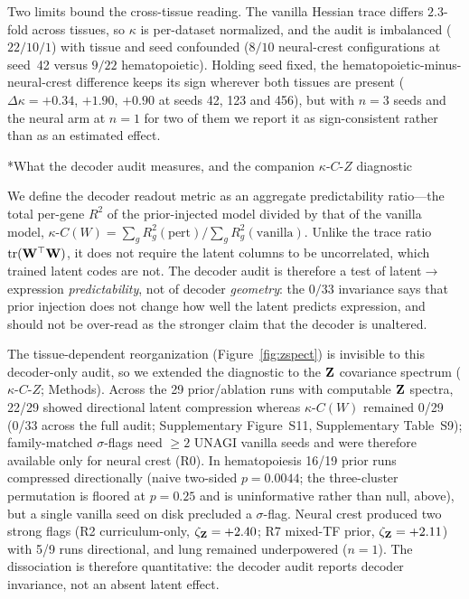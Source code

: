 \documentclass[11pt,a4paper]{article}
\makeatletter
\renewcommand{\subsection}{\@startsection{subsection}{2}{0pt}{10pt plus 4pt}{4pt}{\normalsize\bfseries}}
\newcommand{\tr}{\trloss} %
\makeatother
\begin{document}
Two limits bound the cross-tissue reading. The vanilla Hessian trace differs $2.3$-fold across tissues, so $\kappa$ is per-dataset normalized, and the audit is imbalanced ($22/10/1$) with tissue and seed confounded ($8/10$ neural-crest configurations at seed~42 versus $9/22$ hematopoietic). Holding seed fixed, the hematopoietic-minus-neural-crest difference keeps its sign wherever both tissues are present ($\Delta\kappa=+0.34$, $+1.90$, $+0.90$ at seeds 42, 123 and 456), but with $n=3$ seeds and the neural arm at $n=1$ for two of them we report it as sign-consistent rather than as an estimated effect. 

\subsection*{What the decoder audit measures, and the companion $\kappa$-$C$-$Z$ diagnostic}
\label{sec:predictability}

We define the decoder readout metric as an aggregate predictability ratio---the total per-gene $R^2$ of the prior-injected model divided by that of the vanilla model, $\kappa\text{-}C(W)=\sum_g R^2_g(\text{pert})\big/\sum_g R^2_g(\text{vanilla})$. Unlike the trace ratio $\tr(\Wmat^\top\Wmat)$, it does not require the latent columns to be uncorrelated, which trained latent codes are not. The decoder audit is therefore a test of latent$\to$expression \emph{predictability}, not of decoder \emph{geometry}: the $0/33$ invariance says that prior injection does not change how well the latent predicts expression, and should not be over-read as the stronger claim that the decoder is unaltered.

The tissue-dependent reorganization (Figure~\ref{fig:zspect}) is invisible to this decoder-only audit, so we extended the diagnostic to the $\mathbf{Z}$ covariance spectrum ($\kappa$-$C$-$Z$; Methods). Across the 29 prior/ablation runs with computable $\mathbf{Z}$ spectra, 22/29 showed directional latent compression whereas $\kappa$-$C(W)$ remained 0/29 (0/33 across the full audit; Supplementary Figure~S11, Supplementary Table~S9); family-matched $\sigma$-flags need $\geq2$ UNAGI vanilla seeds and were therefore available only for neural crest (R0). In hematopoiesis 16/19 prior runs compressed directionally (naive two-sided $p=0.0044$; the three-cluster permutation is floored at $p=0.25$ and is uninformative rather than null, above), but a single vanilla seed on disk precluded a $\sigma$-flag. Neural crest produced two strong flags (R2 curriculum-only, $\zeta_{\mathbf{Z}}=+2.40$; R7 mixed-TF prior, $\zeta_{\mathbf{Z}}=+2.11$) with 5/9 runs directional, and lung remained underpowered ($n=1$). The dissociation is therefore quantitative: the decoder audit reports decoder invariance, not an absent latent effect.
\end{document}
